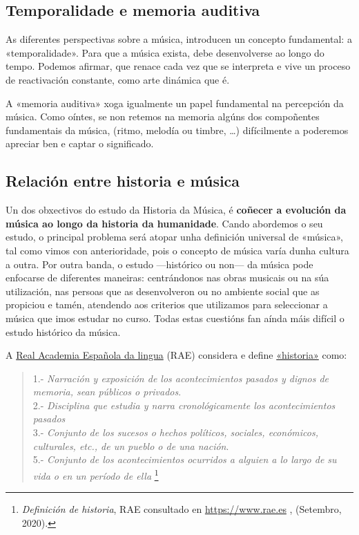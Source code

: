 \documentclass[a4paper, twoside]{templates/ociamthesis}
\begin{document}
\hypertarget{temporalidade-e-memoria-auditiva}{%
\subsection*{Temporalidade e memoria auditiva}\label{temporalidade-e-memoria-auditiva}}

As diferentes perspectivas sobre a música, introducen un concepto fundamental: a «temporalidade». Para que a música exista, debe desenvolverse ao longo do tempo. Podemos afirmar, que renace cada vez que se interpreta e vive un proceso de reactivación constante, como arte dinámica que é.

A «memoria auditiva» xoga igualmente un papel fundamental na percepción da música. Como oíntes, se non retemos na memoria algúns dos compoñentes fundamentais da música, (ritmo, melodía ou timbre, \ldots) difícilmente a poderemos apreciar ben e captar o significado.

\hypertarget{relaciuxf3n-entre-historia-e-muxfasica}{%
\subsection*{Relación entre historia e música}\label{relaciuxf3n-entre-historia-e-muxfasica}}

Un dos obxectivos do estudo da Historia da Música, é \textbf{coñecer a evolución da música ao longo da historia da humanidade}. Cando abordemos o seu estudo, o principal problema será atopar unha definición universal de «música», tal como vimos con anterioridade, pois o concepto de música varía dunha cultura a outra.
Por outra banda, o estudo ---histórico ou non--- da música pode enfocarse de diferentes maneiras: centrándonos nas obras musicais ou na súa utilización, nas persoas que as desenvolveron ou no ambiente social que as propiciou e tamén, atendendo aos criterios que utilizamos para seleccionar a música que imos estudar no curso. Todas estas cuestións fan aínda máis difícil o estudo histórico da música.

A \href{https://dle.rae.es/}{Real Academia Española da lingua} (RAE) considera e define \href{https://dle.rae.es/historia\#otras}{«historia»} como:

\begin{quote}
1.- \emph{Narración y exposición de los acontecimientos pasados y dignos de memoria, sean públicos o privados}.\\
2.- \emph{Disciplina que estudia y narra cronológicamente los acontecimientos pasados}\\
3.- \emph{Conjunto de los sucesos o hechos políticos, sociales, económicos, culturales, etc., de un pueblo o de una nación}.\\
5.- \emph{Conjunto de los acontecimientos ocurridos a alguien a lo largo de su vida o en un período de ella} \footnote{\emph{Definición de historia}, RAE consultado en \url{https://www.rae.es} , (Setembro, 2020).}
\end{quote}
\end{document}
